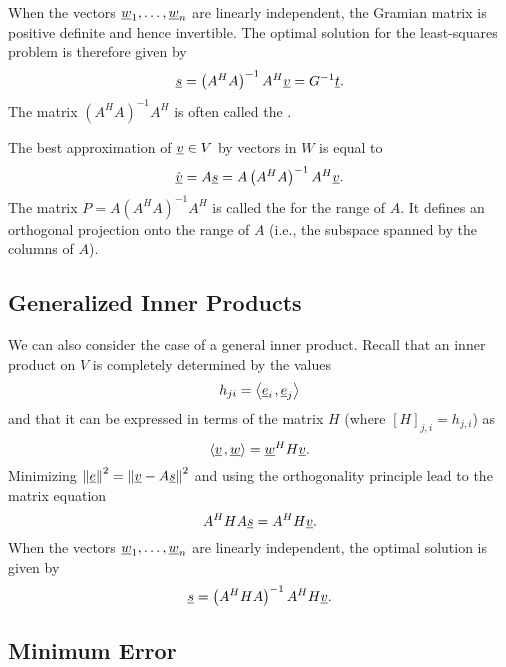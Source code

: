 When the vectors $\underline{w}_1, \ldots, \underline{w}_n$ are linearly independent, the Gramian matrix is positive definite and hence invertible.
The optimal solution for the least-squares problem is therefore given by
\begin{equation*}
\underline{s} = \left( A^H A \right)^{-1} A^H \underline{v} = G^{-1} \underline{t} .
\end{equation*}
The matrix $\left( A^H A \right)^{-1} A^H$ is often called the .

The best approximation of $\underline{v} \in V$ by vectors in $W$ is equal to
\begin{equation*}
\hat{\underline{v}} = A \underline{s} = A \left( A^H A \right)^{-1} A^H \underline{v} .
\end{equation*}
The matrix $P = A \left( A^H A \right)^{-1} A^H$ is called the  for the range of $A$.
It defines an orthogonal projection onto the range of $A$ (i.e., the subspace spanned by the columns of $A$).


\subsection{Generalized Inner Products}

We can also consider the case of a general inner product.
Recall that an inner product on $V$ is completely determined by the values
\begin{equation*}
h_{ji} = {\left\langle  \underline{e}_i  \mskip2mu ,  \underline{e}_j  \right\rangle}
\end{equation*}
and that it can be expressed in terms of the matrix $H$ (where $[H]_{j,i} = h_{j,i}$) as
\begin{equation*}
{\left\langle  \underline{v}  \mskip2mu ,  \underline{w}  \right\rangle}
= \underline{w}^H H \underline{v}.
\end{equation*}
Minimizing $\left\| \underline{e} \right\|^2 = \left\| \underline{v} - A \underline{s} \right\|^2$ and using the orthogonality principle lead to the matrix equation
\begin{equation*}
A^H H A \underline{s} = A^H H \underline{v}.
\end{equation*}
When the vectors $\underline{w}_1, \ldots, \underline{w}_n$ are linearly independent, the optimal solution is given by
\begin{equation*}
\underline{s} = \left( A^H H A \right)^{-1} A^H H \underline{v}.
\end{equation*}


\subsection{Minimum Error}

